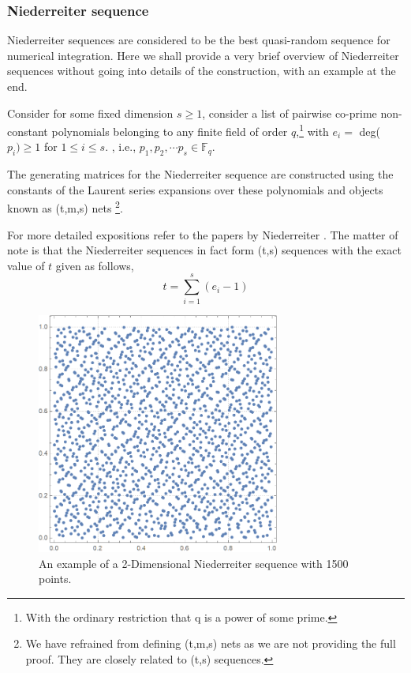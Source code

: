 \documentclass[12pt]{article}
\numberwithin{equation}{section}
\begin{document}
\subsubsection{Niederreiter sequence}
Niederreiter sequences are considered to be the best quasi-random sequence for numerical integration. Here we shall provide a very brief overview of Niederreiter sequences \cite{exactnied, lowdiscrepancyNIEDERREITER198851} without going into details of the construction, with an example at the end.
\par Consider for some fixed dimension $s\geq 1$, consider a list of pairwise co-prime non-constant polynomials belonging to any finite field of order $q$,\footnote{With the ordinary restriction that q is a power of some prime.} with $e_i=$ deg($p_i)\geq 1$ for $1 \leq i \leq s.$ , i.e., $p_1, p_2, \cdots p_s \in \mathbb{F}_q$.
\par The generating matrices for the Niederreiter sequence are constructed using the constants of the Laurent series expansions over these polynomials and objects known as (t,m,s) nets \footnote{We have refrained from defining (t,m,s) nets as we are not providing the full proof. They are closely related to (t,s) sequences.}.
\par For more detailed expositions refer to the papers by Niederreiter \cite{exactnied, tmsandtsnied,lowdiscrepancyNIEDERREITER198851}. The matter of note is that the Niederreiter sequences in fact form (t,s) sequences with the exact value of $t$ given as follows,
$$ t= \sum_{i=1}^{s}(e_i-1) $$
\begin{figure}[!htb]
    \centering
    \includegraphics[width=8cm]{Images/1500neiederreiter.png}
    \caption{An example of a 2-Dimensional Niederreiter sequence with 1500 points.}
    \label{fig:examplenied}
\end{figure}
\end{document}
